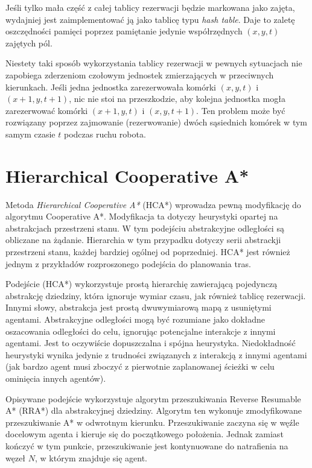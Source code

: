 Jeśli tylko mała część z całej tablicy rezerwacji będzie markowana jako zajęta, wydajniej jest zaimplementować ją jako tablicę typu {\it hash table}. Daje to zaletę oszczędności pamięci poprzez pamiętanie jedynie współrzędnych $(x, y, t)$ zajętych pól.

Niestety taki sposób wykorzystania tablicy rezerwacji w pewnych sytuacjach nie zapobiega zderzeniom czołowym jednostek zmierzających w przeciwnych kierunkach.
Jeśli jedna jednostka zarezerwowała komórki $(x, y, t)$ i $(x + 1, y, t + 1)$, nic nie stoi na przeszkodzie, aby kolejna jednostka mogła zarezerwować komórki $(x + 1, y, t)$ i $(x, y, t + 1)$. Ten problem może być rozwiązany poprzez zajmowanie (rezerwowanie) dwóch sąsiednich komórek w tym samym czasie $t$ podczas ruchu robota.

\section{Hierarchical Cooperative A*}
\label{ch:hier_cooperative_a}
Metoda {\it Hierarchical Cooperative A*} (HCA*) wprowadza pewną modyfikację do algorytmu Cooperative A*. Modyfikacja ta dotyczy heurystyki opartej na abstrakcjach przestrzeni stanu. W tym podejściu abstrakcyjne odległości są obliczane na żądanie. Hierarchia w tym przypadku dotyczy serii abstrackji przestrzeni stanu, każdej bardziej ogólnej od poprzedniej. \cite{cooppath}
HCA* jest również jednym z przykładów rozproszonego podejścia do planowania tras.

Podejście (HCA*) wykorzystuje prostą hierarchię zawierającą pojedynczą abstrakcję dziedziny, która ignoruje wymiar czasu, jak również tablicę rezerwacji.
Innymi słowy, abstrakcja jest prostą dwuwymiarową mapą z usuniętymi agentami. Abstrakcyjne odległości mogą być rozumiane jako dokładne oszacowania odległości do celu, ignorując potencjalne interakcje z innymi agentami. Jest to oczywiście dopuszczalna i spójna heurystyka. Niedokładność heurystyki wynika jedynie z trudności związanych z interakcją z innymi agentami (jak bardzo agent musi zboczyć z pierwotnie zaplanowanej ścieżki w celu ominięcia innych agentów).

Opisywane podejście wykorzystuje algorytm przeszukiwania Reverse Resumable A* (RRA*) dla abstrakcyjnej dziedziny.
Algorytm ten wykonuje zmodyfikowane przeszukiwanie A* w odwrotnym kierunku. Przeszukiwanie zaczyna się w węźle docelowym agenta i kieruje się do początkowego położenia. Jednak zamiast kończyć w tym punkcie, przeszukiwanie jest kontynuowane do natrafienia na węzeł $N$, w którym znajduje się agent.

